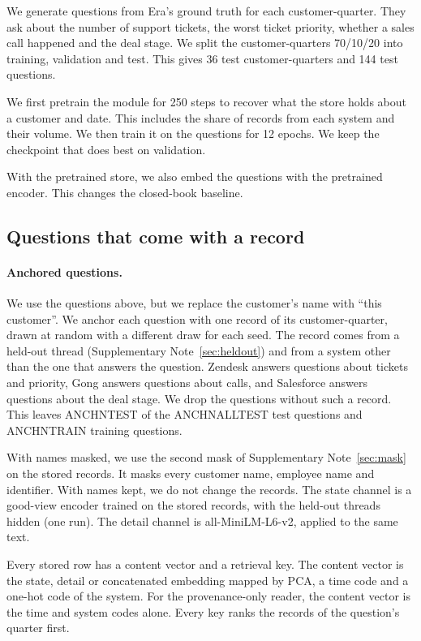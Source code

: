 \documentclass[11pt]{article}
\begin{document}
We generate questions from Era's ground truth for each customer-quarter. They ask about the number of support tickets, the worst ticket priority, whether a sales call happened and the deal stage. We split the customer-quarters 70/10/20 into training, validation and test. This gives 36 test customer-quarters and 144 test questions.

We first pretrain the module for 250 steps to recover what the store holds about a customer and date. This includes the share of records from each system and their volume. We then train it on the questions for 12 epochs. We keep the checkpoint that does best on validation.

With the pretrained store, we also embed the questions with the pretrained encoder. This changes the closed-book baseline.

\subsection{Questions that come with a record}
\paragraph{Anchored questions.} We use the questions above, but we replace the customer's name with ``this customer''. We anchor each question with one record of its customer-quarter, drawn at random with a different draw for each seed. The record comes from a held-out thread (Supplementary Note~\ref{sec:heldout}) and from a system other than the one that answers the question. Zendesk answers questions about tickets and priority, Gong answers questions about calls, and Salesforce answers questions about the deal stage. We drop the questions without such a record. This leaves ANCHNTEST of the ANCHNALLTEST test questions and ANCHNTRAIN training questions.

With names masked, we use the second mask of Supplementary Note~\ref{sec:mask} on the stored records. It masks every customer name, employee name and identifier. With names kept, we do not change the records. The state channel is a good-view encoder trained on the stored records, with the held-out threads hidden (one run). The detail channel is all-MiniLM-L6-v2, applied to the same text.

Every stored row has a content vector and a retrieval key. The content vector is the state, detail or concatenated embedding mapped by PCA, a time code and a one-hot code of the system. For the provenance-only reader, the content vector is the time and system codes alone. Every key ranks the records of the question's quarter first.
\end{document}
